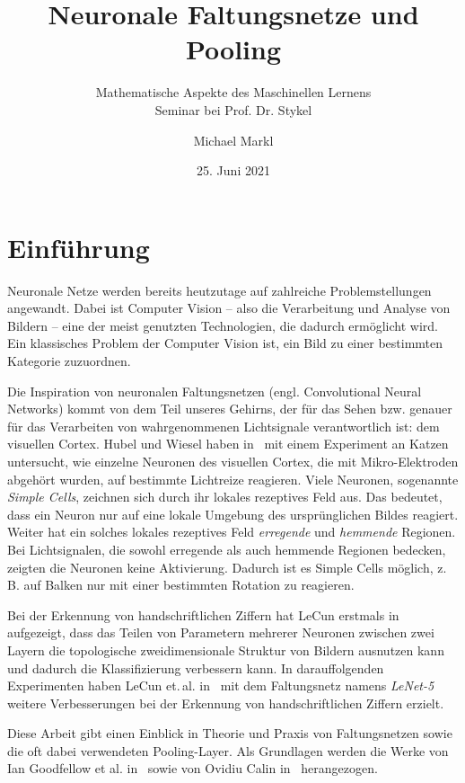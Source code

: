 \documentclass[paper=a4, 	%
		fontsize=11pt,
		abstract=true, 	%
		headsepline, 	%
		notitlepage	%
		]{scrartcl}
\title{Neuronale Faltungsnetze und Pooling}
\author{Michael Markl}
\date{25. Juni 2021}
\subtitle{Mathematische Aspekte des Maschinellen Lernens\\ Seminar bei Prof. Dr. Stykel}
\theoremstyle{definition}
\begin{document}
\maketitle


\section{Einführung}

Neuronale Netze werden bereits heutzutage auf zahlreiche Problemstellungen angewandt.
Dabei ist Computer Vision -- also die Verarbeitung und Analyse von Bildern -- eine der meist genutzten Technologien, die dadurch ermöglicht wird.
Ein klassisches Problem der Computer Vision ist, ein Bild zu einer bestimmten Kategorie zuzuordnen.

Die Inspiration von neuronalen Faltungsnetzen (engl. \foreignlanguage{english}{Convolutional Neural Networks}) kommt von dem Teil unseres Gehirns, der für das Sehen bzw. genauer für das Verarbeiten von wahrgenommenen Lichtsignale verantwortlich ist: dem visuellen Cortex.
Hubel und Wiesel haben in~\cite{Hubel1959,Hubel1962} mit einem Experiment an Katzen untersucht, wie einzelne Neuronen des visuellen Cortex, die mit Mikro-Elektroden abgehört wurden, auf bestimmte Lichtreize reagieren.
Viele Neuronen, sogenannte \emph{\foreignlanguage{english}{Simple Cells}}, zeichnen sich durch ihr lokales rezeptives Feld aus.
Das bedeutet, dass ein Neuron nur auf eine lokale Umgebung des ursprünglichen Bildes reagiert.
Weiter hat ein solches lokales rezeptives Feld \emph{erregende} und \emph{hemmende} Regionen.
Bei Lichtsignalen, die sowohl erregende als auch hemmende Regionen bedecken, zeigten die Neuronen keine Aktivierung.
Dadurch ist es \foreignlanguage{english}{Simple Cells} möglich, z.\,B. auf Balken nur mit einer bestimmten Rotation zu reagieren.


Bei der Erkennung von handschriftlichen Ziffern hat LeCun erstmals in~\cite{LeCun1989} aufgezeigt, dass das Teilen von Parametern mehrerer Neuronen zwischen zwei Layern die topologische zweidimensionale Struktur von Bildern ausnutzen kann und dadurch die Klassifizierung verbessern kann.
In darauffolgenden Experimenten haben LeCun et.\,al. in~\cite{lecun1998} mit dem Faltungsnetz namens \emph{LeNet-5} weitere Verbesserungen bei der Erkennung von handschriftlichen Ziffern erzielt.

Diese Arbeit gibt einen Einblick in Theorie und Praxis von Faltungsnetzen sowie die oft dabei verwendeten Pooling-Layer.
Als Grundlagen werden die Werke von Ian Goodfellow et al. in~\cite[Kapitel~9]{Goodfellow-et-al-2016} sowie von Ovidiu Calin in~\cite[Kapitel~15,16]{Calin2020} herangezogen.
\end{document}

